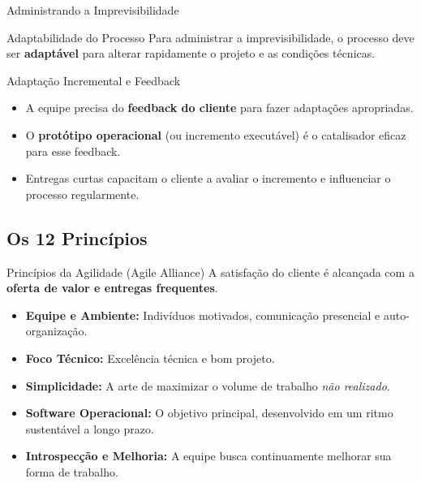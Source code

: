 \documentclass[aspectratio=169, 9pt]{beamer}
\begin{document}
\begin{frame}{Administrando a Imprevisibilidade}
  \begin{block}{Adaptabilidade do Processo}
    Para administrar a imprevisibilidade, o processo deve ser \textbf{adaptável} para alterar rapidamente o projeto e as condições técnicas.
  \end{block}

  \vspace{0.2cm}
  \begin{block}{Adaptação Incremental e Feedback}
    \begin{itemize}
      \item A equipe precisa do \textbf{feedback do cliente} para fazer adaptações apropriadas.
      \item O \textbf{protótipo operacional} (ou incremento executável) é o catalisador eficaz para esse feedback.
      \item Entregas curtas capacitam o cliente a avaliar o incremento e influenciar o processo regularmente.
    \end{itemize}
  \end{block}
\end{frame}

\subsection{Os 12 Princípios}
\begin{frame}{Princípios da Agilidade (Agile Alliance)}
  A satisfação do cliente é alcançada com a \textbf{oferta de valor e entregas frequentes}.
  
  \vspace{0.2cm}
  \begin{itemize}
    \item \textbf{Equipe e Ambiente:} Indivíduos motivados, comunicação presencial e auto-organização.
    \item \textbf{Foco Técnico:} Excelência técnica e bom projeto. 
    \item \textbf{Simplicidade:} A arte de maximizar o volume de trabalho \textit{não realizado}.
    \item \textbf{Software Operacional:} O objetivo principal, desenvolvido em um ritmo sustentável a longo prazo.
    \item \textbf{Introspecção e Melhoria:} A equipe busca continuamente melhorar sua forma de trabalho.
  \end{itemize}
\end{frame}
\end{document}
